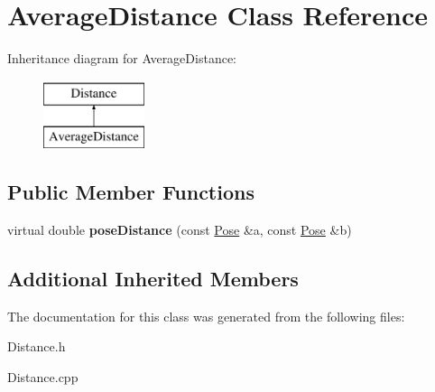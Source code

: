 \hypertarget{classAverageDistance}{}\section{Average\+Distance Class Reference}
\label{classAverageDistance}
Inheritance diagram for Average\+Distance\+:\begin{figure}[H]
\begin{center}
\leavevmode
\includegraphics[height=2.000000cm]{classAverageDistance}
\end{center}
\end{figure}
\subsection*{Public Member Functions}
\begin{DoxyCompactItemize}
\item 
\hypertarget{classAverageDistance_a131c831306970b481cb8a35008c73326}{}virtual double {\bfseries pose\+Distance} (const \hyperlink{classPose}{Pose} \&a, const \hyperlink{classPose}{Pose} \&b)\label{classAverageDistance_a131c831306970b481cb8a35008c73326}

\end{DoxyCompactItemize}
\subsection*{Additional Inherited Members}


The documentation for this class was generated from the following files\+:\begin{DoxyCompactItemize}
\item 
Distance.\+h\item 
Distance.\+cpp\end{DoxyCompactItemize}
